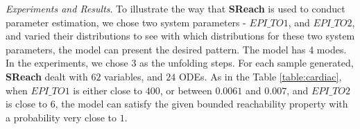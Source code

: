 \textit{Experiments and Results}. To illustrate the way that {\bf SReach} is used to conduct parameter estimation, we chose two system parameters - $EPI\_TO1$, and $EPI\_TO2$, and varied their distributions to see with which distributions for these two system parameters, the model can present the desired pattern. The model has 4 modes. In the experiments, we chose $3$ as the unfolding steps. For each sample generated, {\bf SReach} dealt with $62$ variables, and $24$ ODEs. As in the Table \ref{table:cardiac}, when $EPI\_TO1$ is either close to $400$, or between $0.0061$ and $0.007$, and $EPI\_TO2$ is close to $6$, the model can satisfy the given bounded reachability property with a probability very close to $1$. 

\begin{comment}

\subsection{Application to the stabilization control of quadcopters}

\textit{Model Description}.
We modeled the stabilization control of a quadcopter, and are interested in analyzing its robustness. In other words, given an arbitrary initial location and position, this model will guarantee that the quadcopter will soon become stable via adjusting velocities of four rotors. To specify the arbitrary initial status, we introduced 6 random variables: ($x_0$, $y_0$, $z_0$) (the initial location),  $\phi_0$ (the initial roll angle), $\theta_0$ (the initial pitch angle), and $\psi_0$ (the initial yaw angle).

\textit{Experiments and Results}. To validate this model, {\bf SReach} was adopted with the BIFT statistical testing option.  

\end{comment}


